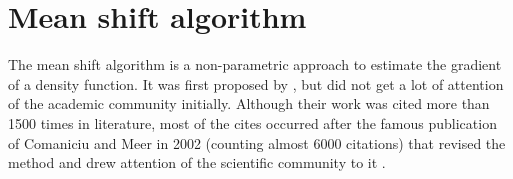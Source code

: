 \newpage
{}
{}


\chapter[Mean shift algorithm]{Mean shift algorithm}\label{mean_shift}
The mean shift algorithm is a non-parametric approach to estimate the gradient of a density function. It was first proposed by \citet{Fukunaga1975}, but did not get a lot of attention of the academic community initially. Although their work was cited more than 1500 times in literature, most of the cites occurred after the famous publication of Comaniciu and Meer in 2002 (counting almost 6000 citations) that revised the method and drew attention of the scientific community to it \citep{Comaniciu2002}.

